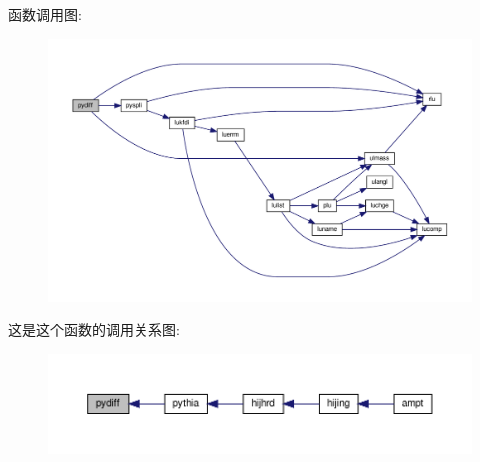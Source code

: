 函数调用图\+:
\nopagebreak
\begin{figure}[H]
\begin{center}
\leavevmode
\includegraphics[width=350pt]{pydiff_8f90_a973c4594f689ccebe5ec7cac4d282a3b_cgraph}
\end{center}
\end{figure}
这是这个函数的调用关系图\+:
\nopagebreak
\begin{figure}[H]
\begin{center}
\leavevmode
\includegraphics[width=350pt]{pydiff_8f90_a973c4594f689ccebe5ec7cac4d282a3b_icgraph}
\end{center}
\end{figure}
